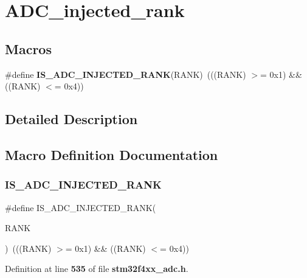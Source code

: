 \section{A\+D\+C\+\_\+injected\+\_\+rank}
\label{group__ADC__injected__rank}
\subsection*{Macros}
\begin{DoxyCompactItemize}
\item 
\#define \textbf{ I\+S\+\_\+\+A\+D\+C\+\_\+\+I\+N\+J\+E\+C\+T\+E\+D\+\_\+\+R\+A\+NK}(R\+A\+NK)~(((R\+A\+NK) $>$= 0x1) \&\& ((\+R\+A\+N\+K) $<$= 0x4))
\end{DoxyCompactItemize}


\subsection{Detailed Description}


\subsection{Macro Definition Documentation}
\mbox{\label{group__ADC__injected__rank_ga63f95f9a45f4d718aabc9e429d860e9d}} 
\subsubsection{I\+S\+\_\+\+A\+D\+C\+\_\+\+I\+N\+J\+E\+C\+T\+E\+D\+\_\+\+R\+A\+NK}
{\footnotesize\ttfamily \#define I\+S\+\_\+\+A\+D\+C\+\_\+\+I\+N\+J\+E\+C\+T\+E\+D\+\_\+\+R\+A\+NK(\begin{DoxyParamCaption}\item[{}]{R\+A\+NK }\end{DoxyParamCaption})~(((R\+A\+NK) $>$= 0x1) \&\& ((\+R\+A\+N\+K) $<$= 0x4))}



Definition at line \textbf{ 535} of file \textbf{ stm32f4xx\+\_\+adc.\+h}.

